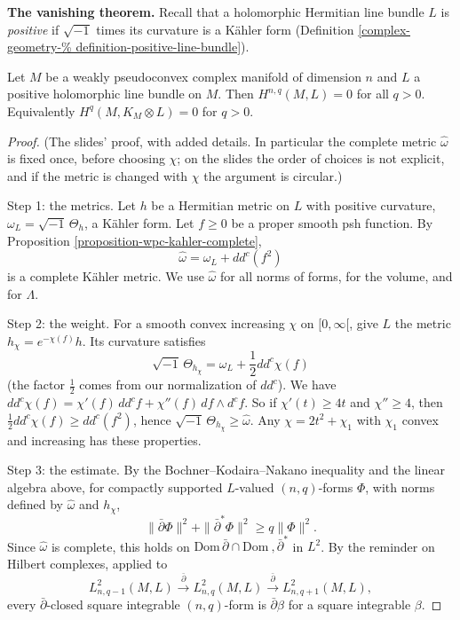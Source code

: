 \medskip\noindent
{\bf The vanishing theorem.} Recall that a
holomorphic Hermitian line bundle $L$ is
\emph{positive} if $\sqrt{-1}$ times its
curvature is a K\"ahler form (Definition
\ref{complex-geometry-%
definition-positive-line-bundle}).

\begin{theorem}
\label{theorem-vanishing-wpc-positive}
Let $M$ be a weakly pseudoconvex complex
manifold of dimension $n$ and $L$ a positive
holomorphic line bundle on $M$. Then
$H^{n,q}(M,L)=0$ for all $q>0$. Equivalently
$H^q(M,K_M\otimes L)=0$ for $q>0$.
\end{theorem}

\begin{proof}
(The slides' proof, with added details. In
particular the complete metric $\hat\omega$
is fixed once, before
choosing $\chi$; on the slides the order of
choices is not explicit, and if the metric is
changed with $\chi$ the argument is
circular.)

Step 1: the metrics. Let $h$ be a Hermitian
metric on $L$ with positive curvature,
$\omega_L=\sqrt{-1}\,\Theta_h$, a K\"ahler
form. Let $f\geq0$ be a proper smooth psh
function. By Proposition
\ref{proposition-wpc-kahler-complete},
$$
\hat\omega=\omega_L+dd^c(f^2)
$$
is a complete K\"ahler metric. We use
$\hat\omega$ for all norms of forms, for the
volume, and for $\Lambda$.

Step 2: the weight. For a smooth convex
increasing $\chi$ on $[0,\infty[$, give $L$
the metric $h_\chi=e^{-\chi(f)}h$. Its
curvature satisfies
$$
\sqrt{-1}\,\Theta_{h_\chi}=\omega_L
+\frac{1}{2}dd^c\chi(f)
$$
(the factor $\frac12$ comes from our
normalization of $dd^c$). We have
$dd^c\chi(f)=\chi'(f)\,dd^cf+\chi''(f)\,df
\wedge
d^cf$. So if $\chi'(t)\geq4t$ and
$\chi''\geq4$, then
$\frac{1}{2}dd^c\chi(f)\geq dd^c(f^2)$, hence
$\sqrt{-1}\,\Theta_{h_\chi}\geq\hat\omega$.
Any $\chi=2t^2+\chi_1$ with $\chi_1$ convex
and increasing has these properties.

Step 3: the estimate. By the
Bochner--Kodaira--Nakano inequality and the
linear algebra above, for compactly supported
$L$-valued $(n,q)$-forms $\Phi$, with norms
defined by $\hat\omega$ and $h_\chi$,
$$
\|\bar\partial\Phi\|^2
+\|\bar\partial^*\Phi\|^2\geq q\|\Phi\|^2 .
$$
Since $\hat\omega$ is complete, this holds on
$\mathrm{Dom}\,\bar\partial\cap\mathrm{Dom}\
,\bar\partial^*$
in $L^2$. By the reminder on Hilbert
complexes, applied to
$$
L^2_{n,q-1}(M,L)
\xrightarrow{\bar\partial}L^2_{n,q}(M,L)
\xrightarrow{\bar\partial}L^2_{n,q+1}(M,L),
$$
every $\bar\partial$-closed square integrable
$(n,q)$-form is $\bar\partial\beta$ for a
square integrable $\beta$.


\end{proof}
